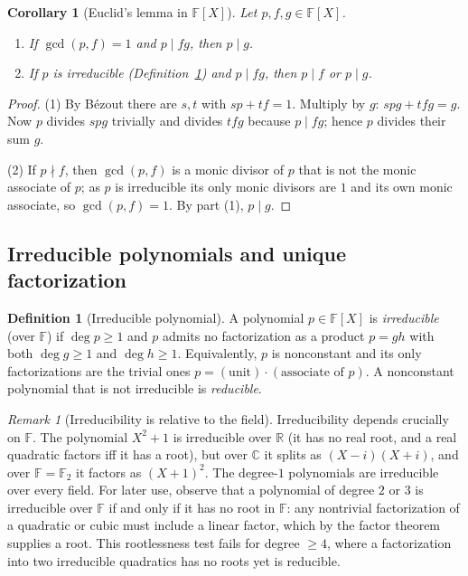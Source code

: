 \documentclass[11pt,a4paper]{article}
\newtheorem{corollary}[theorem]{Corollary}
\theoremstyle{definition}
\newtheorem{definition}[theorem]{Definition}
\theoremstyle{remark}
\newtheorem{remark}[theorem]{Remark}
\newcommand{\R}{\ensuremath{\mathbb{R}}}
\providecommand{\C}{}\renewcommand{\C}{\ensuremath{\mathbb{C}}}
\newcommand{\F}{\ensuremath{\mathbb{F}}}
\begin{document}
\begin{corollary}[{Euclid's lemma in \(\F[X]\)}]\label{polynomials:cor:euclid-lemma}
Let \(p, f, g \in \F[X]\).
\begin{enumerate}
  \item If \(\gcd(p, f) = 1\) and \(p \mid f g\), then \(p \mid g\).
  \item If \(p\) is irreducible (Definition~\ref{polynomials:def:irreducible})
        and \(p \mid f g\), then \(p \mid f\) or \(p \mid g\).
\end{enumerate}
\end{corollary}

\begin{proof}
(1) By B\'ezout there are \(s, t\) with \(s p + t f = 1\). Multiply by \(g\):
\(s p g + t f g = g\). Now \(p\) divides \(s p g\) trivially and divides
\(t f g\) because \(p \mid f g\); hence \(p\) divides their sum \(g\).

(2) If \(p \nmid f\), then \(\gcd(p, f)\) is a monic divisor of \(p\) that is not
the monic associate of \(p\); as \(p\) is irreducible its only monic divisors are
\(1\) and its own monic associate, so \(\gcd(p, f) = 1\). By part (1),
\(p \mid g\).
\end{proof}
\subsection{Irreducible polynomials and unique factorization}
\label{polynomials:subsec:ufd}

\begin{definition}[Irreducible polynomial]\label{polynomials:def:irreducible}
A polynomial \(p \in \F[X]\) is \emph{irreducible} (over \(\F\)) if
\(\deg p \ge 1\) and \(p\) admits no factorization as a product \(p = g h\) with both
\(\deg g \ge 1\) and \(\deg h \ge 1\). Equivalently, \(p\) is nonconstant and its
only factorizations are the trivial ones \(p = (\text{unit})\cdot(\text{associate
of } p)\). A nonconstant polynomial that is not irreducible is \emph{reducible}.
\end{definition}

\begin{remark}[Irreducibility is relative to the field]\label{polynomials:rem:relative}
Irreducibility depends crucially on \(\F\). The polynomial \(X^2 + 1\) is
irreducible over \(\R\) (it has no real root, and a real quadratic factors iff it
has a root), but over \(\C\) it splits as \((X - i)(X + i)\), and over
\(\F = \mathbb{F}_2\) it factors as \((X+1)^2\). The degree-\(1\) polynomials are
irreducible over every field. For later use, observe that a polynomial of degree
\(2\) or \(3\) is irreducible over \(\F\) if and only if it has no root in \(\F\):
any nontrivial factorization of a quadratic or cubic must include a linear
factor, which by the factor theorem supplies a root. This rootlessness test fails
for degree \(\ge 4\), where a factorization into two irreducible quadratics has
no roots yet is reducible.
\end{remark}
\end{document}
